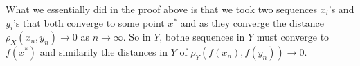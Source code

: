 \documentclass[a4paper]{article}
\begin{document}
\begin{theorem}
\begin{remark}
  What we essentially did in the proof above is that we took two sequences $x_i$'s and  $y_i$'s that both converge to some point  $x^{*}$ and as they converge the distance $\rho_{X}(x_n,y_n) \to 0$ as $n \to \infty$. So in $Y$, bothe sequences in  $Y$ must converge to  $f(x^{*})$ and similarily the distances in $Y$ of  $\rho_Y (f(x_n), f(y_n)) \to 0$.  
\end{remark}
\end{theorem}
\end{document}
